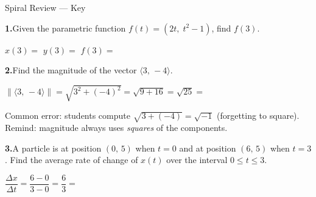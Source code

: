 \documentclass[10pt]{article}
\begin{document}
\namedateperiod

\vspace{0.12in}

\begin{notesbox}{Spiral Review --- Key}
\small

\textbf{1.}\quad Given the parametric function $f(t)=(2t,\;t^{2}-1)$, find $f(3)$.

\vspace{0.08in}
\hspace{1em} $x(3) = $  \qquad $y(3) = $ 
\qquad $f(3) = $ 

\vspace{0.18in}

\textbf{2.}\quad Find the magnitude of the vector $\langle 3,\,-4\rangle$.

\vspace{0.08in}
\hspace{1em} $\|\langle 3,\,-4\rangle\| = \sqrt{3^{2}+(-4)^{2}} = \sqrt{9+16} = \sqrt{25} = $ 

\begin{teachernote}
  Common error: students compute $\sqrt{3+(-4)}=\sqrt{-1}$ (forgetting to square).
  Remind: magnitude always uses \emph{squares} of the components.
\end{teachernote}

\vspace{0.18in}

\textbf{3.}\quad A particle is at position $(0,\,5)$ when $t=0$ and at position
$(6,\,5)$ when $t=3$.
Find the average rate of change of $x(t)$ over the interval $0\le t\le 3$.

\vspace{0.08in}
\hspace{1em} $\dfrac{\Delta x}{\Delta t} = \dfrac{6-0}{3-0} = \dfrac{6}{3} = $ 

\end{notesbox}
\end{document}
